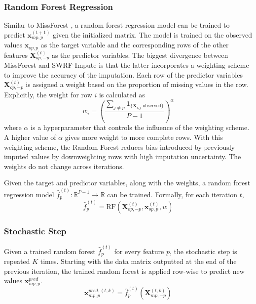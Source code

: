 \documentclass[preprint,longauthor,twocolumn]{aastex631}
\begin{document}
\subsubsection{Random Forest Regression}
Similar to MissForest \citep{stekhovenMissForestnonparametricMissingValue2012}, a random forest regression model can be trained to predict $\mathbf{x}^{(t+1)}_{mp,p}$ given the initialized matrix. The model is trained on the observed values $\mathbf{x}_{op,p}$ as the target variable and the corresponding rows of the other features $\mathbf{X}^{(t)}_{op,-p}$ as the predictor variables. The biggest divergence between MissForest and SWRF-Impute is that the latter incorporates a weighting scheme to improve the accuracy of the imputation. Each row of the predictor variables $\mathbf{X}^{(t)}_{op,-p}$ is assigned a weight based on the proportion of missing values in the row. Explicitly, the weight for row $i$ is calculated as
\begin{equation}
  w_i = \left(\frac{\sum_{j \neq p} \mathbf{1}_{\{\mathbf{X}_{i,j} \text{ observed}\}}}{P-1}\right)^\alpha
\end{equation}
where $\alpha$ is a hyperparameter that controls the influence of the weighting scheme. A higher value of $\alpha$ gives more weight to more complete rows. With this weighting scheme, the Random Forest reduces bias introduced by previously imputed values by downweighting rows with high imputation uncertainty. The weights do not change across iterations.

Given the target and predictor variables, along with the weights, a random forest regression model $\hat{f}^{(t)}_p : \mathbb{R}^{P-1} \rightarrow \mathbb{R}$ can be trained. Formally, for each iteration $t$,
\begin{equation}
  \hat{f}^{(t)}_p = \text{RF}\left(\mathbf{X}^{(t)}_{op,-p}, \mathbf{x}^{(t)}_{op,p},w\right)
\end{equation}

\subsubsection{Stochastic Step}
Given a trained random forest $\hat{f}^{(t)}_p$ for every feature $p$, the stochastic step is repeated $K$ times. Starting with the data matrix outputted at the end of the previous iteration, the trained random forest is applied row-wise to predict new values $\mathbf{x}^{pred}_{mp,p}$.
\begin{equation}
  \mathbf{x}^{pred,(t,k)}_{mp,p} = \hat{f}^{(t)}_p(\mathbf{X}^{(t,k)}_{mp,-p})
\end{equation}
\end{document}
